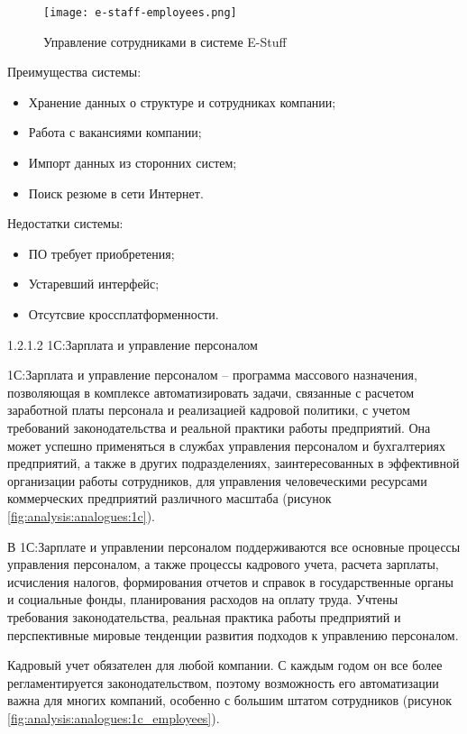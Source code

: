\begin{figure}[!h]
	\centering
	\texttt{[image: e-staff-employees.png]} 
	\caption{Управление сотрудниками в системе E-Stuff}
	\label{fig:analysis:analogues:e-staff-employees}
\end{figure}

Преимущества системы:
\begin{itemize}
	\item Хранение данных о структуре и сотрудниках компании;
	\item Работа с вакансиями компании;
	\item Импорт данных из сторонних систем;
	\item Поиск резюме в сети Интернет.
\end{itemize}

Недостатки системы:
\begin{itemize}
	\item ПО требует приобретения;
	\item Устаревший интерфейс;
	\item Отсутсвие кроссплатформенности.
\end{itemize}

1.2.1.2 1С:Зарплата и управление персоналом

1С:Зарплата и управление персоналом -- программа массового назначения, позволяющая в комплексе автоматизировать
задачи, связанные с расчетом заработной платы персонала и реализацией кадровой политики, с учетом требований
законодательства и реальной практики работы предприятий. Она может успешно применяться в службах управления персоналом
и бухгалтериях предприятий, а также в других подразделениях, заинтересованных в эффективной организации работы
сотрудников, для управления человеческими ресурсами коммерческих предприятий различного масштаба
(рисунок \ref{fig:analysis:analogues:1c}).

В 1С:Зарплате и управлении персоналом поддерживаются все основные процессы управления персоналом, а также процессы
кадрового учета, расчета зарплаты, исчисления налогов, формирования отчетов и справок в государственные органы и
социальные фонды, планирования расходов на оплату труда. Учтены требования законодательства, реальная практика работы
предприятий и перспективные мировые тенденции развития подходов к управлению персоналом.

Кадровый учет обязателен для любой компании. С каждым годом он все более регламентируется законодательством, поэтому
возможность его автоматизации важна для многих компаний, особенно с большим штатом сотрудников
(рисунок \ref{fig:analysis:analogues:1c_employees}).


